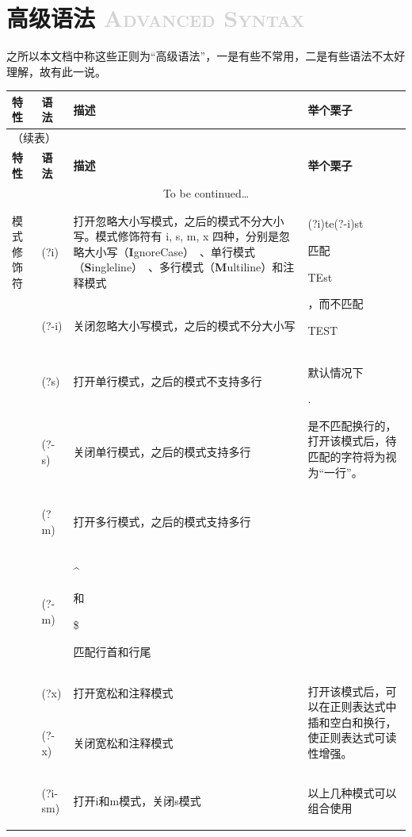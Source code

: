 \documentclass[12pt,a4paper,twoside]{ctexart}
\newcommand{\cbregex}[1]{\colorbox{orange!18}{\strut #1}}
\newcommand{\cbmatch}[1]{\colorbox{cyan!35}{\strut #1}}
\newcommand{\cbstring}[1]{\colorbox{green!20}{\strut #1}}
\begin{document}
\section[高级语法]{高级语法 \textcolor{lightgray}{\textsc{Advanced Syntax}}}
\label{sec:adv-syntax}

之所以本文档中称这些正则为“高级语法”，一是有些不常用，二是有些语法不太好理解，故有此一说。

\begin{center}

\begin{longtable}{p{4em}p{9em}p{25em}p{18em}}
  \toprule
  \textbf{特性} & \textbf{语法} & \textbf{描述} & \textbf{举个栗子} \\
  \midrule
  \endfirsthead                 %
  \multicolumn{4}{l}{（续表）} \\
  \toprule
  \textbf{特性} & \textbf{语法} & \textbf{描述} & \textbf{举个栗子} \\
  \midrule
  \endhead                      %
  \multicolumn{4}{c}{To be continued\ldots} \\[2ex]
  \endfoot                      %
  \bottomrule
  \endlastfoot                  %
  模式\newline{}修饰符 & \cbregex{(?i)} & 打开忽略大小写模式，之后的模式不分大小写。模式修饰符有 i, s, m, x 四种，分别是忽略大小写（\textbf{I}gnoreCase）~、单行模式（\textbf{S}ingleline）~、多行模式（\textbf{M}ultiline）和注释模式 & \multirow{2}{18em}{\cbregex{(?i)te(?-i)st} 匹配 \cbmatch{TEst}，而不匹配 \cbstring{TEST}} \\
  & \cbregex{(?-i)} & 关闭忽略大小写模式，之后的模式不分大小写 & \\
  & \cbregex{(?s)} & 打开单行模式，之后的模式不支持多行 & \multirow{2}{18em}{默认情况下\cbregex{.}是不匹配换行的，打开该模式后，待匹配的字符将为视为“一行”。} \\
  & \cbregex{(?-s)} & 关闭单行模式，之后的模式支持多行 & \\
  & \cbregex{(?m)} & 打开多行模式，之后的模式支持多行 & \\
  & \cbregex{(?-m)} & \cbregex{\^{}} 和 \cbregex{\$} 匹配行首和行尾 & \\
  & \cbregex{(?x)} & 打开宽松和注释模式 & \multirow{2}{18em}{打开该模式后，可以在正则表达式中插和空白和换行，使正则表达式可读性增强。} \\
  & \cbregex{(?-x)} & 关闭宽松和注释模式 & \\
  & \cbregex{(?i-sm)} & 打开i和m模式，关闭s模式 & \multirow{2}{18em}{以上几种模式可以组合使用} \\

\end{longtable}
\end{center}
\end{document}
